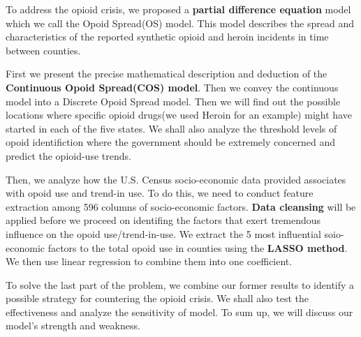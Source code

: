To address the opioid crisis, we proposed a \textbf{partial difference equation} model which we call the Opoid Spread(OS) model. This model describes the spread and characteristics of the reported synthetic opioid and heroin incidents in time between counties.

First we present the precise mathematical description and deduction of the \textbf{Continuous Opoid Spread(COS) model}. Then we convey the continuous model into a Discrete Opoid Spread model. Then we will find out the possible locations where specific opioid drugs(we used Heroin for an example) might have started in each of the five states. We shall also analyze the threshold levels of opoid identifiction where the government should be extremely concerned and predict the opioid-use trends.

Then, we analyze how the U.S. Census socio-economic data provided associates with opoid use and trend-in use. To do this, we need to conduct feature extraction among 596 columns of socio-economic factors. \textbf{Data cleansing} will be applied before we proceed on identifing the factors that exert tremendous influence on the opoid use/trend-in-use. We extract the  5 most influential soio-economic factors to the total opoid use in counties using the \textbf{LASSO method}. We then use linear regression to combine them into one coefficient.

To solve the last part of the problem, we combine our former results to identify a possible strategy for countering the opioid crisis. We shall also test the effectiveness and analyze the sensitivity of model. To sum up, we will discuss our model's strength and weakness.






